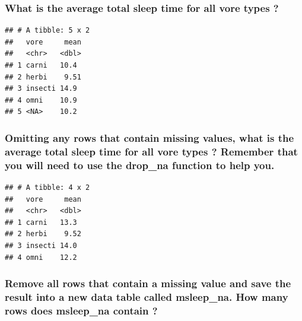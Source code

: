 \documentclass[]{book}
\begin{document}
\hypertarget{what-is-the-average-total-sleep-time-for-all-vore-types}{%
\subsubsection{What is the average total sleep time for all vore types ?}\label{what-is-the-average-total-sleep-time-for-all-vore-types}}

\begin{verbatim}
## # A tibble: 5 x 2
##   vore     mean
##   <chr>   <dbl>
## 1 carni   10.4 
## 2 herbi    9.51
## 3 insecti 14.9 
## 4 omni    10.9 
## 5 <NA>    10.2
\end{verbatim}

\hypertarget{omitting-any-rows-that-contain-missing-values-what-is-the-average-total-sleep-time-for-all-vore-types-remember-that-you-will-need-to-use-the-drop_na-function-to-help-you.}{%
\subsubsection{\texorpdfstring{Omitting any rows that contain missing values, what is the average total sleep time for all vore types ? Remember that you will need to use the \textbf{drop\_na} function to help you.}{Omitting any rows that contain missing values, what is the average total sleep time for all vore types ? Remember that you will need to use the drop\_na function to help you.}}\label{omitting-any-rows-that-contain-missing-values-what-is-the-average-total-sleep-time-for-all-vore-types-remember-that-you-will-need-to-use-the-drop_na-function-to-help-you.}}

\begin{verbatim}
## # A tibble: 4 x 2
##   vore     mean
##   <chr>   <dbl>
## 1 carni   13.3 
## 2 herbi    9.52
## 3 insecti 14.0 
## 4 omni    12.2
\end{verbatim}

\hypertarget{remove-all-rows-that-contain-a-missing-value-and-save-the-result-into-a-new-data-table-called-msleep_na.-how-many-rows-does-msleep_na-contain}{%
\subsubsection{\texorpdfstring{Remove all rows that contain a missing value and save the result into a new data table called \textbf{msleep\_na}. How many rows does msleep\_na contain ?}{Remove all rows that contain a missing value and save the result into a new data table called msleep\_na. How many rows does msleep\_na contain ?}}\label{remove-all-rows-that-contain-a-missing-value-and-save-the-result-into-a-new-data-table-called-msleep_na.-how-many-rows-does-msleep_na-contain}}
\end{document}
